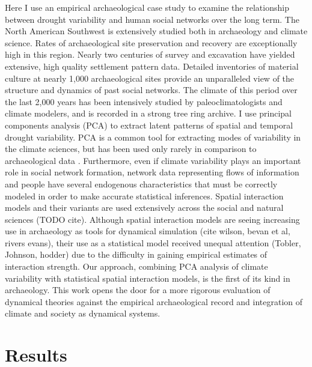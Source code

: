 \documentclass[fleqn,10pt]{wlscirep}
\begin{document}
Here I use an empirical archaeological case study to examine the relationship between drought variability and human social networks over the long term. The North American Southwest is extensively studied both in archaeology and climate science. Rates of archaeological site preservation and recovery are exceptionally high in this region. Nearly two centuries of survey and excavation have yielded extensive, high quality settlement pattern data. Detailed inventories of material culture at nearly 1,000 archaeological sites provide an unparalleled view of the structure and dynamics of past social networks. The climate of this period over the last 2,000 years has been intensively studied by paleoclimatologists and climate modelers, and is recorded in a strong tree ring archive. I use principal components analysis (PCA) to extract latent patterns of spatial and temporal drought variability. PCA is a common tool for extracting modes of variability in the climate sciences, but has been used only rarely in comparison to archaeological data \cite{Weiss1982,vanwest}. Furthermore, even if climate variability plays an important role in social network formation, network data representing flows of information and people have several endogenous characteristics that must be correctly modeled in order to make accurate statistical inferences. Spatial interaction models and their variants are used extensively across the social and natural sciences (TODO cite). Although spatial interaction models are seeing increasing use in archaeology as tools for dynamical simulation (cite wilson, bevan et al, rivers evans), their use as a statistical model received unequal attention (Tobler, Johnson, hodder) due to the difficulty in gaining empirical estimates of interaction strength. Our approach, combining PCA analysis of climate variability with statistical spatial interaction models, is the first of its kind in archaeology. This work opens the door for a more rigorous evaluation of dynamical theories against the empirical archaeological record and integration of climate and society as dynamical systems.


\section*{Results}
\end{document}
